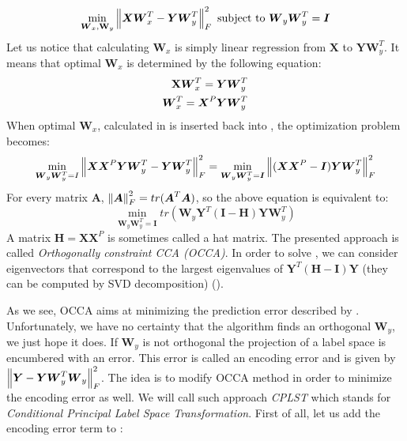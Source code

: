 \begin{equation}\label{eq:cplst1}
    \min_{\boldsymbol{W}_x, \bold{W}_y} \left\lVert\boldsymbol{X}\boldsymbol{W}_x^T-\boldsymbol{Y}\boldsymbol{W}_y^T\right\rVert_{F}^2  
    \text{  subject to   } \boldsymbol{W}_y\boldsymbol{W}_y^T=\boldsymbol{I}   
\end{equation}
Let us notice that calculating $\boldsymbol{W}_x$ is simply linear regression from $\boldsymbol{X}$ to $\boldsymbol{Y}\boldsymbol{W}_y^T$. It means that optimal $\boldsymbol{W}_x$ is determined by the following equation:
\begin{equation}\label{eq:cplst2}
\begin{split}
    \bold{X}\boldsymbol{W}_x^T=\boldsymbol{Y}\boldsymbol{W}_y^T \\
    \boldsymbol{W}_x^T=\boldsymbol{X}^P\boldsymbol{Y}\boldsymbol{W}_y^T
\end{split}
\end{equation}
When optimal $\boldsymbol{W}_x$, calculated in  is inserted back into , the optimization problem becomes:
\begin{equation}\label{eq:cplst3}
    \min_{\boldsymbol{W}_y\boldsymbol{W}_y^T=I} \left\lVert\boldsymbol{X}\boldsymbol{X}^P\boldsymbol{Y}\boldsymbol{W}_y^T-\boldsymbol{Y}\boldsymbol{W}_y^T\right\rVert_{F}^2=\min_{\boldsymbol{W}_y\boldsymbol{W}_y^T=\boldsymbol{I}} \left\lVert(\boldsymbol{X}\boldsymbol{X}^P-\boldsymbol{I})\boldsymbol{Y}\boldsymbol{W}_y^T\right\rVert_{F}^2
\end{equation}
For every matrix $\boldsymbol{A}$, $\left\lVert\boldsymbol{A}\right\rVert_{F}^2=tr(\boldsymbol{A}^T\boldsymbol{A})$, so the above equation is equivalent to:
\begin{equation}\label{eq:cplst4}
    \min_{\boldsymbol{W}_y\boldsymbol{W}_y^T=\boldsymbol{I}} tr(\boldsymbol{W}_y\boldsymbol{Y}^T(\boldsymbol{I}-\boldsymbol{H})\boldsymbol{Y}\boldsymbol{W}_y^T)
\end{equation}
A matrix $\boldsymbol{H}=\boldsymbol{X}\boldsymbol{X}^P$ is sometimes called a hat matrix. The presented approach is called \textit{Orthogonally constraint CCA (OCCA)}. In order to solve , we can consider eigenvectors that correspond to the largest eigenvalues of $\boldsymbol{Y}^T(\boldsymbol{H}-\boldsymbol{I})\boldsymbol{Y}$ (they can be computed by SVD decomposition) (\cite{ChenLin}).

As we see, OCCA aims at minimizing the prediction error described by . Unfortunately, we have no certainty that the algorithm finds an orthogonal $\boldsymbol{W}_y$, we just hope it does. If $\boldsymbol{W}_y$ is not orthogonal the projection of a label space is encumbered with an error. This error is called an encoding error and is given by $\left\lVert\boldsymbol{Y}-\boldsymbol{Y}\boldsymbol{W}_y^T\boldsymbol{W}_y\right\rVert_{F}^2$. The idea is to modify OCCA method in order to minimize the encoding error as well. We will call such approach \textit{CPLST} which stands for \textit{Conditional Principal Label Space Transformation}. First of all, let us add the encoding error term to : 

